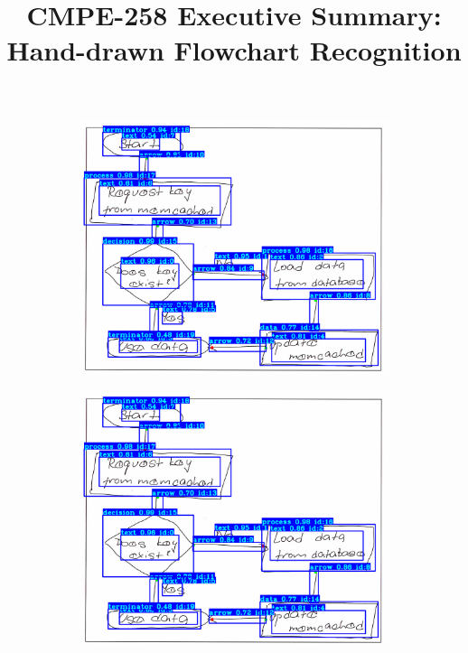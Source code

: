 \documentclass[10pt]{article}
\begin{document}
\thispagestyle{empty}

\vspace{-2em}
\title{\textsc{CMPE-258} Executive Summary: Hand-drawn Flowchart Recognition}
\date{}

\vspace{-2em}
\author{}

\maketitle

\vspace{-5em}

\begin{figure}[h]
\centering
\begin{subfigure}{0.28\columnwidth}
\includegraphics[width=\columnwidth]{sample.png}
\end{subfigure}
\begin{subfigure}{0.28\columnwidth}
\includegraphics[width=\columnwidth]{sample.png}

\end{subfigure}
\end{figure}
\end{document}
